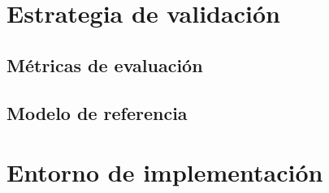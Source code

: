 \section{Estrategia de validación}
\label{sec:estrategia_validacion}

\subsection{Métricas de evaluación}

\subsection{Modelo de referencia}


\section{Entorno de implementación}
\label{sec:implementacion}


